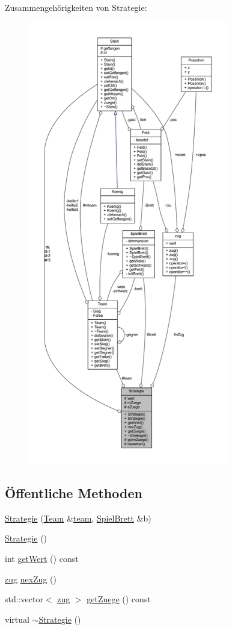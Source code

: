 Zusammengehörigkeiten von Strategie\+:\nopagebreak
\begin{figure}[H]
\begin{center}
\leavevmode
\includegraphics[height=550pt]{class_strategie__coll__graph}
\end{center}
\end{figure}
\subsection*{Öffentliche Methoden}
\begin{DoxyCompactItemize}
\item 
\hyperlink{class_strategie_a607fb1d583895e1e61905488e8836933}{Strategie} (\hyperlink{class_team}{Team} \&\hyperlink{class_strategie_a4f55e74f189ec8c6df88a57119fb3def}{team}, \hyperlink{class_spiel_brett}{Spiel\+Brett} \&b)
\item 
\hyperlink{class_strategie_a374010dd594a0977765d179377e76c12}{Strategie} ()
\item 
int \hyperlink{class_strategie_afeba2e4743f7cfe036115b92af4fc624}{get\+Wert} () const 
\item 
\hyperlink{structzug}{zug} \hyperlink{class_strategie_a106e1746778cc926fc7392c3224025b1}{nex\+Zug} ()
\item 
std\+::vector$<$ \hyperlink{structzug}{zug} $>$ \hyperlink{class_strategie_a4fd1fa322e0c44651cd72893c3ed5e9c}{get\+Zuege} () const 
\item 
virtual \hyperlink{class_strategie_a6eaa087b8a8f41d3e99ce7ed617d0432}{$\sim$\+Strategie} ()
\end{DoxyCompactItemize}
